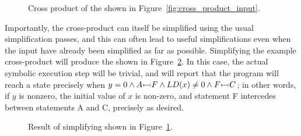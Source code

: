 \begin{figure}
  \caption{Cross product of the {\StateMachines} shown in
    Figure~\ref{fig:cross_product_input}. }
  \label{fig:cross_product_output}
\end{figure}


 Importantly, the cross-product
     {\StateMachine} can itself be simplified using the usual
     {\StateMachine} simplification passes, and this can often lead to
     useful simplifications even when the input {\StateMachines} have
     already been simplified as far as possible.  Simplifying the
     example cross-product {\StateMachine} will produce the
     {\StateMachine} shown in
     Figure~\ref{fig:cross_product_output_opt}.  In this case, the
     actual symbolic execution step will be trivial, and will report
     that the program will reach a  state precisely when
     $y = 0 \wedge A {\leftarrowtail} F \wedge LD(x) \not= 0 \wedge
     F {\leftarrowtail} C$; in other words, if $y$ is nonzero, the
     initial value of $x$ is non-zero, and statement F intercedes
     between statements A and C, precisely as desired.

\begin{figure}
  \begin{centering}
  \end{centering}
  \caption{Result of simplifying {\StateMachine} shown in
    Figure~\ref{fig:cross_product_output}.}
  \label{fig:cross_product_output_opt}
\end{figure}

